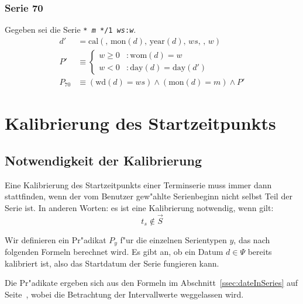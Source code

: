 \documentclass[a4paper]{article}
\newcommand*{\dayf}{\mathrm{day}}
\newcommand*{\monf}{\mathrm{mon}}
\newcommand*{\yearf}{\mathrm{year}}
\newcommand*{\wdf}{\mathrm{wd}}
\newcommand*{\womf}{\mathrm{wom}}
\newcommand*{\calf}{\mathrm{cal}}
\numberwithin{equation}{section}
\begin{document}
\subsubsection{Serie 70}
Gegeben sei die Serie \texttt{* \textit{m} */1 \textit{ws}:\textit{w}}.
\begin{equation}
\begin{split}
  d' & = \calf(,\,\monf(d),\,\yearf(d),\,ws,\,,\,w) \\
  P' & \equiv \left\{\begin{array}{ll}
      w \ge 0 & : \womf(d) = w \\
      w < 0 & : \dayf(d) = \dayf(d')
    \end{array}\right. \\
  P_{70} & \equiv (\wdf(d) = ws) \wedge (\monf(d) = m) \wedge P'
\end{split}
\end{equation}



%
%
%
%
\section{Kalibrierung des Startzeitpunkts}


%
%
\subsection{Notwendigkeit der Kalibrierung}
\noindent Eine Kalibrierung des Startzeitpunkts einer Terminserie muss immer
dann stattfinden, wenn der vom Benutzer gew"ahlte Serienbeginn nicht selbst Teil
der Serie ist. In anderen Worten: es ist eine Kalibrierung notwendig, wenn gilt:
\begin{equation}
  t_s \notin \vec{S}
\end{equation}

Wir definieren ein Pr"adikat $P_y$ f"ur die einzelnen Serientypen $y$, das nach
folgenden Formeln berechnet wird. Es gibt an, ob ein Datum $d \in \Psi$ bereits
kalibriert ist, also das Startdatum der Serie fungieren kann.

Die Pr"adikate ergeben sich aus den Formeln im Abschnitt~\ref{ssec:dateInSeries}
auf Seite~\pageref{ssec:dateInSeries}, wobei die Betrachtung der Intervallwerte
weggelassen wird.
\end{document}
